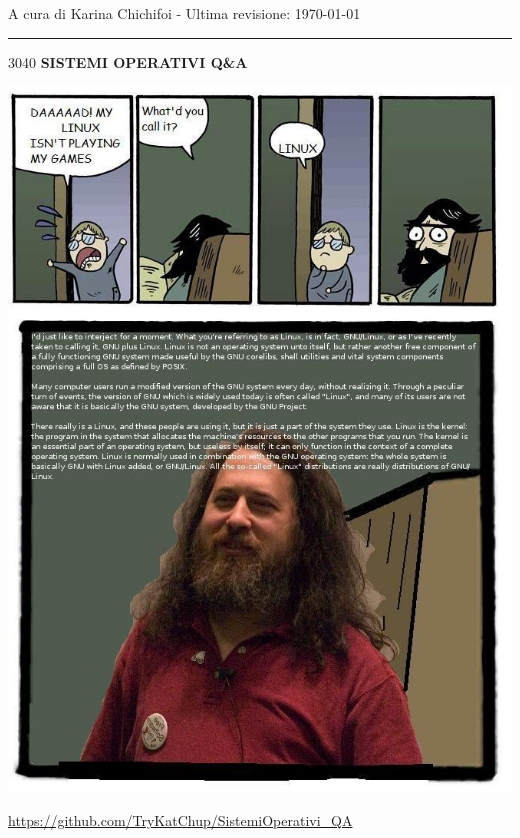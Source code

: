 \documentclass{article}
\makeatletter
\newcommand\HUGE{\@setfontsize\Huge{30}{40}}
\makeatother
\begin{document}
\begin{titlepage}
	\centering
	\large
	A cura di Karina Chichifoi - Ultima revisione: \today

	\noindent\rule{15cm}{0.2pt}

	\vspace{1.5cm}

	\HUGE
	\textbf{SISTEMI OPERATIVI Q\&A}

	\vspace{1.5cm}

	\includegraphics[scale=0.6]{ab6.jpg}

	\vspace{1.5cm}

	\normalsize
	\url{https://github.com/TryKatChup/SistemiOperativi_QA}

	\clearpage
\end{titlepage}
\renewcommand{\abstractname}{}
\end{document}
